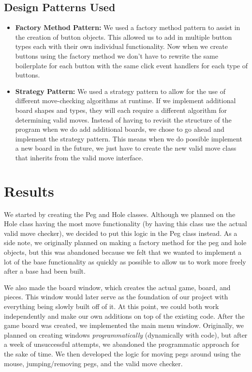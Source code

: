 \documentclass[10pt,conference,onecolumn,compsoc]{IEEEtran}
\begin{document}
\subsection{Design Patterns Used}
\begin{itemize}
    \item \textbf{Factory Method Pattern:} We used a factory method pattern to assist in the creation of button objects. This allowed us to add in multiple button types each with their own individual functionality. Now when we create buttons using the factory method we don't have to rewrite the same boilerplate for each button with the same click event handlers for each type of buttons. 
    \item \textbf{Strategy Pattern:} We used a strategy pattern to allow for the use of different move-checking algorithms at runtime. If we implement additional board shapes and types, they will each require a different algorithm for determining valid moves. Instead of having to revisit the structure of the program when we do add additional boards, we chose to go ahead and implement the strategy pattern. This means when we do possible implement a new board in the future, we just have to create the new valid move class that inherits from the valid move interface.
\end{itemize}

\section{Results}
We started by creating the Peg and Hole classes. Although we planned on the Hole class having the most move functionality (by having this class use the actual valid move checker), we decided to put this logic in the Peg class instead. As a side note, we originally planned on making a factory method for the peg and hole objects, but this was abandoned because we felt that we wanted to implement a lot of the base functionality as quickly as possible to allow us to work more freely after a base had been built.\newline

We also made the board window, which creates the actual game, board, and pieces. This window would later serve as the foundation of our project with everything being slowly built off of it. At this point, we could both work independently and make our own additions on top of the existing code. After the game board was created, we implemented the main menu window. Originally, we planned on creating windows \textit{programmatically} (dynamically with code), but after a week of unsuccessful attempts, we abandoned the programmatic approach for the sake of time. We then developed the logic for moving pegs around using the mouse, jumping/removing pegs, and the valid move checker. \newline
\end{document}
